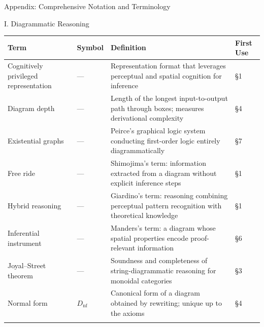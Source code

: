 \documentclass[
  ignorenonframetext,
]{beamer}
\newcounter{none} %
\begin{document}
\begin{frame}[fragile]{Appendix: Comprehensive Notation and Terminology}
\begin{block}{I. Diagrammatic Reasoning}
\protect{}\label{i.-diagrammatic-reasoning}
{\def\LTcaptype{none} %
\begin{longtable}[]{@{}
  >{\raggedright\arraybackslash}p{}
  >{\centering\arraybackslash}p{}
  >{\raggedright\arraybackslash}p{}
  >{\centering\arraybackslash}p{}@{}}
\toprule\noalign{}
\begin{minipage}[b]{\linewidth}\raggedright
Term
\end{minipage} & \begin{minipage}[b]{\linewidth}\centering
Symbol
\end{minipage} & \begin{minipage}[b]{\linewidth}\raggedright
Definition
\end{minipage} & \begin{minipage}[b]{\linewidth}\centering
First Use
\end{minipage} \\
\midrule\noalign{}
\endhead
Cognitively privileged representation & --- & Representation format that
leverages perceptual and spatial cognition for inference & §1 \\
Diagram depth & --- & Length of the longest input-to-output path through
boxes; measures derivational complexity & §4 \\
Existential graphs & --- & Peirce's graphical logic system conducting
first-order logic entirely diagrammatically & §7 \\
Free ride & --- & Shimojima's term: information extracted from a diagram
without explicit inference steps & §1 \\
Hybrid reasoning & --- & Giardino's term: reasoning combining perceptual
pattern recognition with theoretical knowledge & §1 \\
Inferential instrument & --- & Manders's term: a diagram whose spatial
properties encode proof-relevant information & §6 \\
Joyal--Street theorem & --- & Soundness and completeness of
string-diagrammatic reasoning for monoidal categories & §3 \\
Normal form & \(D_{\text{nf}}\) & Canonical form of a diagram obtained
by rewriting; unique up to the axioms & §4 \\
\bottomrule\noalign{}
\end{longtable}
}
\end{block}


\end{frame}
\end{document}
